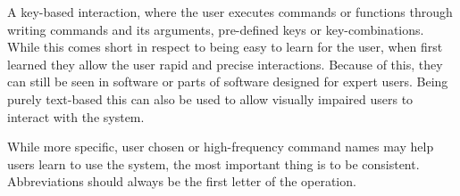 \begin{definition} \label{def:command-line_interface} 
  A key-based interaction, where the user executes commands or functions through writing commands and its arguments, pre-defined keys or key-combinations. While this comes short in respect to being easy to learn for the user, when first learned they allow the user rapid and precise interactions. Because of this, they can still be seen in software or parts of software designed for expert users. Being purely text-based this can also be used to allow visually impaired users to interact with the system.
  \cite[p. 159]{rogers}
\end{definition}

\begin{remark}
  While more specific, user chosen or high-frequency command names may help users learn to use the system, the most important thing is to be consistent. Abbreviations should always be the first letter of the operation. 
  \cite[p. 160]{rogers}
\end{remark}